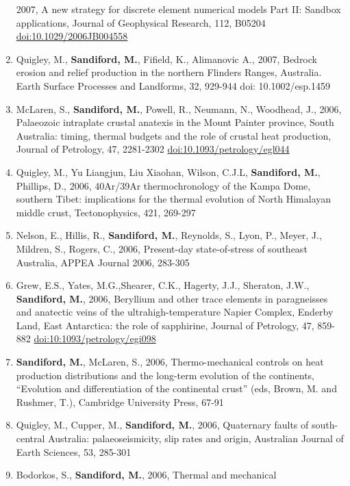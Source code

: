 \documentclass[
]{article}
\begin{document}
\begin{enumerate}
  2007, A new strategy for discrete element numerical models Part II:
  Sandbox applications, Journal of Geophysical Research, 112, B05204
  \url{doi:10.1029/2006JB004558} 
\item
  Quigley, M., \textbf{Sandiford, M.}, Fifield, K., Alimanovic A., 2007,
  Bedrock erosion and relief production in the northern Flinders Ranges,
  Australia. Earth Surface Processes and Landforms, 32, 929-944 doi:
  10.1002/esp.1459 
\item
  McLaren, S., \textbf{Sandiford, M.}, Powell, R., Neumann, N.,
  Woodhead, J., 2006, Palaeozoic intraplate crustal anatexis in the
  Mount Painter province, South Australia: timing, thermal budgets and
  the role of crustal heat production, Journal of Petrology, 47,
  2281-2302 \url{doi:10.1093/petrology/egl044}
\item
  Quigley, M., Yu Liangjun, Liu Xiaohan, Wilson, C.J.L,
  \textbf{Sandiford, M.}, Phillips, D., 2006, 40Ar/39Ar thermochronology
  of the Kampa Dome, southern Tibet: implications for the thermal
  evolution of North Himalayan middle crust, Tectonophysics, 421,
  269-297 
\item
  Nelson, E., Hillis, R., \textbf{Sandiford, M.}, Reynolds, S., Lyon,
  P., Meyer, J., Mildren, S., Rogers, C., 2006, Present-day
  state-of-stress of southeast Australia, APPEA Journal 2006, 283-305
\item
  Grew, E.S., Yates, M.G.,Shearer, C.K., Hagerty, J.J., Sheraton, J.W.,
  \textbf{Sandiford, M.}, 2006, Beryllium and other trace elements in
  paragneisses and anatectic veins of the ultrahigh-temperature Napier
  Complex, Enderby Land, East Antarctica: the role of sapphirine,
  Journal of Petrology, 47, 859-882 \url{doi:10:1093/petrology/egi098}
\item
  \textbf{Sandiford, M.}, McLaren, S., 2006, Thermo-mechanical controls
  on heat production distributions and the long-term evolution of the
  continents, ``Evolution and differentiation of the continental crust''
  (eds, Brown, M. and Rushmer, T.), Cambridge University Press, 67-91
\item
  Quigley, M., Cupper, M., \textbf{Sandiford, M.}, 2006, Quaternary
  faults of south-central Australia: palaeoseismicity, slip rates and
  origin, Australian Journal of Earth Sciences, 53, 285-301
\item
  Bodorkos, S., \textbf{Sandiford, M.}, 2006, Thermal and mechanical

\end{enumerate}
\end{document}
